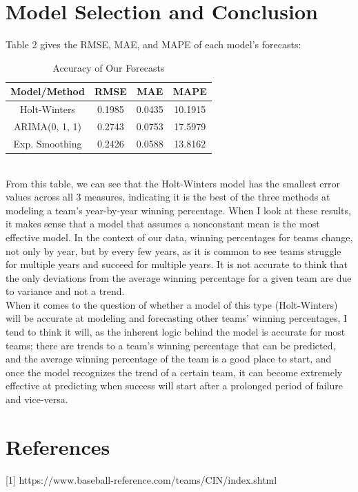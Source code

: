 \documentclass[12pt]{article}
\begin{document}
\section{Model Selection and Conclusion}\label{sec:chapter}
Table 2 gives the RMSE, MAE, and MAPE of each model's forecasts:
\begin{table}[h]
\begin{center}
\begin{tabular}{ |c|c|c|c| } 
 \hline
 \textbf{Model/Method} & \textbf{RMSE} & \textbf{MAE} & \textbf{MAPE}\\
 \hline
 Holt-Winters & 0.1985 & 0.0435 & 10.1915\\
 \hline
 ARIMA(0, 1, 1) & 0.2743 & 0.0753 & 17.5979\\ 
 \hline
 Exp. Smoothing & 0.2426 & 0.0588 & 13.8162\\ 
 \hline
\end{tabular}
\caption{Accuracy of Our Forecasts}
\label{table:Table 2}
\end{center}
\end{table}\\
From this table, we can see that the Holt-Winters model has the smallest error values across all 3 measures, indicating it is the best of the three methods at modeling a team's year-by-year winning percentage. When I look at these results, it makes sense that a model that assumes a nonconstant mean is the most effective model. In the context of our data, winning percentages for teams change, not only by year, but by every few years, as it is common to see teams struggle for multiple years and succeed for multiple years. It is not accurate to think that the only deviations from the average winning percentage for a given team are due to variance and not a trend.\\
When it comes to the question of whether a model of this type (Holt-Winters) will be accurate at modeling and forecasting other teams' winning percentages, I tend to think it will, as the inherent logic behind the model is accurate for most teams; there are trends to a team's winning percentage that can be predicted, and the average winning percentage of the team is a good place to start, and once the model recognizes the trend of a certain team, it can become extremely effective at predicting when success will start after a prolonged period of failure and vice-versa.\\

\section{References}\label{sec:chapter}
[1] https://www.baseball-reference.com/teams/CIN/index.shtml
\end{document}
